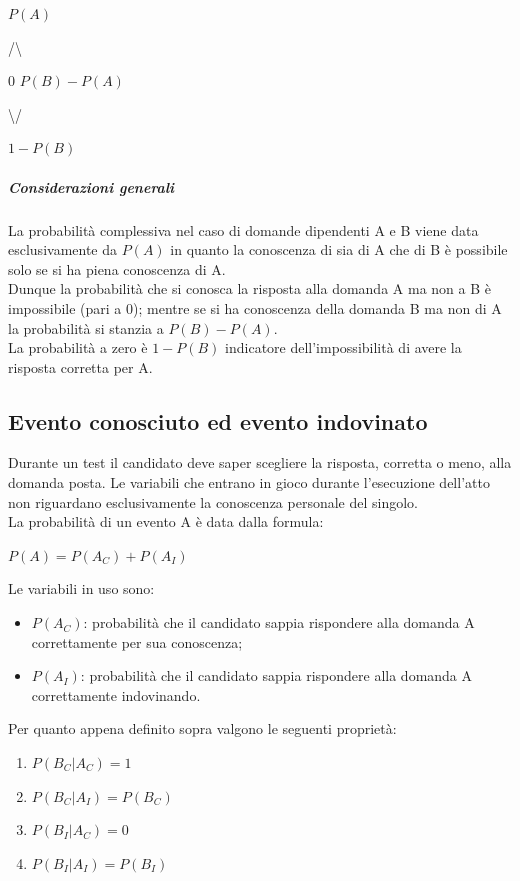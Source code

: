 \begin{center} $P(A)$ \end{center}
\begin{center} /\textbackslash \end{center}
\begin{center} 0  $P(B)-P(A)$ \end{center}
\begin{center} \textbackslash / \end{center}
\begin{center} $1-P(B)$ \end{center}
\noindent
\subparagraph{Considerazioni generali}
\label{Considerazioni generali A implica B}
\noindent
 La probabilit\`a complessiva nel caso di domande dipendenti A e B viene data esclusivamente da $P(A)$ in quanto la conoscenza di sia di A che di B \`e  possibile solo se si ha piena conoscenza di A.\\  Dunque la probabilit\`a  che si conosca la risposta alla domanda  A ma non a B  \`e impossibile (pari a 0); mentre se si ha conoscenza della domanda B ma non di A la probabilit\`a si stanzia a $P(B)-P(A)$.\\ 
La probabilit\`a a zero \`e $1-P(B)$ indicatore dell'impossibilit\`a  di avere la risposta corretta per A.

\subsection{Evento conosciuto ed evento indovinato}
\label{Evento conosciuto ed evento indovinato}
Durante un test il candidato deve saper scegliere la risposta, corretta o meno, alla domanda posta. Le variabili che entrano in gioco durante l'esecuzione dell'atto non riguardano esclusivamente la conoscenza personale del singolo.
\\
La probabilit\`a di un evento A \`e data dalla formula:
\begin{center} $P(A)=P(A_{C})+P(A_{I})$\end{center} 
Le variabili in uso sono:
\begin{itemize}
\item $P(A_{C})$: probabilit\`a che il candidato sappia rispondere alla domanda A correttamente per sua conoscenza;
\item $P(A_{I})$: probabilit\`a che il candidato sappia rispondere alla domanda A correttamente indovinando.
\end{itemize}

\noindent
Per quanto appena definito sopra valgono le seguenti propriet\`a:
\begin{enumerate}
\item $P(B_{C}|A_{C})=1$

\item $P(B_{C}|A_{I})=P(B_{C})$ 

\item $P(B_{I}|A_{C})=0$

\item $P(B_{I}|A_{I})=P(B_{I})$ 
\end{enumerate}
\noindent

